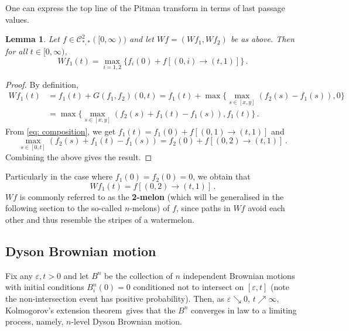 \documentclass[11pt, reqno]{amsart}
\numberwithin{equation}{section}
\newcounter{dummy} \numberwithin{dummy}{section}
\newtheorem{lemma}[dummy]{Lemma}
\begin{document}
One can express the top line of the Pitman transform in terms of last passage values. 

\begin{lemma}\label{lemma: Pitman melon}
    Let \(f\in \mathscr{C}^2_{*,*}([0,\infty))\) and let \(Wf = (Wf_1, Wf_2)\) be as above. Then for all \(t\in[0,\infty)\),
    \begin{equation*}
    Wf_1(t) = \displaystyle \max_{i=1,2}\{f_i(0) + f [(0, i) \to (t, 1)]\} \,.
    \end{equation*}
\end{lemma}%

\begin{proof}
    By definition, 
    \begin{align*}
        Wf_1(t)&= f_1(t)+G(f_1, f_2)(0,t)= f_1(t) + \max\{\displaystyle \max_{s\in[x,y]}(f_2(s)-f_1(s)), 0 \}\\
        &= \max\{\displaystyle \max_{s\in[x,y]}(f_2(s)+f_1(t)-f_1(s)), f_1(t) \}\,.
    \end{align*}
    From \eqref{eq: composition}, we get \(f_1(t) = f_1(0) + f [(0, 1) \to (t, 1)]\) and \begin{equation*} \displaystyle \max_{s\in[0,t]}(f_2(s) + f_1(t) - f_1(s)) = f_2(0) + f [(0, 2) \to (t, 1)]\,.\end{equation*} Combining the above gives the result. 
\end{proof}

Particularly in the case where \(f_1(0) = f_2(0) = 0\), we obtain that 
\begin{equation*}
Wf_1(t) = f [(0, 2) \to (t, 1)]\,.
\end{equation*}
\(Wf\) is commonly referred to as the \textbf{2-melon} (which will be generalised in the following section to the so-called $n$-melons) of $f$, since paths in \(Wf\) avoid each other and thus resemble the stripes of a watermelon.



\subsection{Dyson Brownian motion} 

Fix any $\varepsilon, t > 0$ and let $B^n$ be the collection of $n$ independent Brownian motions with initial conditions $B^n_i(0) = 0$ conditioned not to intersect on $[\varepsilon, t]$ (note the non-intersection event has positive probability). Then, as $\varepsilon \searrow 0$, $t \nearrow \infty$, Kolmogorov's extension theorem~gives that the $B^n$ converges in law to a limiting process, namely, $n$-level Dyson Brownian motion.
\end{document}
